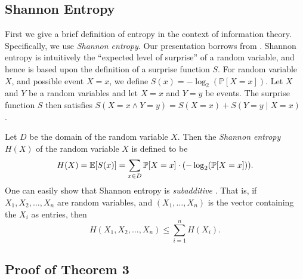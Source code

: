 \documentclass[12pt, a4paper]{article}
\begin{document}
\subsection{Shannon Entropy}\label{ssec:shannonEntropy}
First we give a brief definition of entropy in the context of information theory. Specifically, we use \textit{Shannon entropy}. Our presentation %
 borrows from \cite{DG14}. Shannon entropy is intuitively the ``expected level of surprise'' of a random variable, and hence is based upon the definition of a surprise function $S$. For random variable $X$, and possible event $X=x$, we define $S(x)=-\log_2(\mathbb{P}[X=x])$. Let $X$ and $Y$ be a random variables and let $X=x$ and $Y=y$ be events. The surprise function $S$ then satisfies $S(X=x\land Y=y) = S(X=x) + S(Y=y\mid X=x)$ \cite{DG14}.
 
Let $D$ be the domain of the random variable $X$. Then the \textit{Shannon entropy} $H(X)$ of the random variable $X$ is defined to be
\begin{equation*}
	H(X)
	 = \mathbb{E}[S(x)]\\
	 = \sum_{x\in D}\mathbb{P}[X=x]\cdot (-\log_2(\mathbb{P}[X=x])).
\end{equation*}
One can easily show that Shannon entropy is \textit{subadditive} \cite{DG14}. That is, if $X_1, X_2, \ldots, X_n$ are random variables, and $(X_1,\dots,X_n)$ is the vector containing the $X_i$ as entries, then
	\begin{equation}\label{subadditivityDefinition}
			H(X_1, X_2, \ldots, X_n)\le \sum_{i=1}^{n}H(X_i).
	\end{equation}

\subsection{Proof of Theorem 3}
\end{document}
